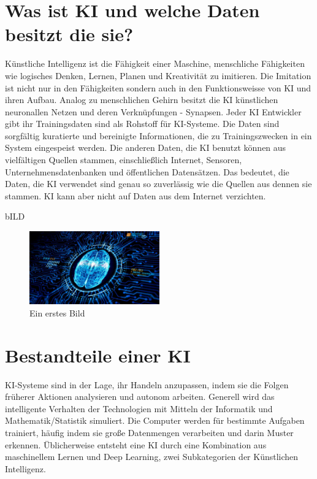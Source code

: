 \documentclass{report}
\begin{document}
\chapter{Was ist KI und welche Daten besitzt die sie?}

Künstliche Intelligenz ist die Fähigkeit einer Maschine, menschliche Fähigkeiten wie logisches Denken, 
Lernen, Planen und Kreativität zu imitieren. Die Imitation ist nicht nur in den Fähigkeiten sondern auch in den 
Funktionsweisse von KI und ihren Aufbau. Analog zu menschlichen Gehirn besitzt die KI künstlichen neuronallen Netzen und 
deren Verknüpfungen - Synapsen. Jeder KI Entwickler gibt ihr Trainingsdaten sind als Rohstoff für KI-Systeme. Die Daten sind sorgfältig 
kuratierte und bereinigte Informationen, die zu Trainingszwecken in ein System eingespeist werden.
Die anderen Daten, die KI benutzt können aus vielfältigen Quellen stammen, einschließlich Internet, Sensoren,
  Unternehmensdatenbanken und öffentlichen Datensätzen. Das bedeutet, die Daten, die KI verwendet sind genau so zuverlässig wie die Quellen aus dennen sie stammen.
KI kann aber nicht auf Daten aus dem Internet verzichten.  


bILD\begin{figure}[h]
  \centering 
  \includegraphics[width=0.5\textwidth]{ki-im-sensor.jpg} 
  \caption{Ein erstes Bild}
  \label{fig:meme}
  \end{figure}

   \chapter{Bestandteile einer KI}
 
KI-Systeme sind in der Lage, ihr Handeln anzupassen, indem sie die Folgen früherer Aktionen analysieren und autonom arbeiten.
 Generell wird das intelligente Verhalten der 
Technologien mit Mitteln der Informatik und Mathematik/Statistik simuliert.
 Die Computer werden für bestimmte Aufgaben trainiert, häufig indem sie große Datenmengen 
 verarbeiten und darin Muster erkennen. Üblicherweise entsteht eine KI durch eine Kombination aus maschinellem
  Lernen und Deep Learning, zwei Subkategorien der Künstlichen Intelligenz.
\end{document}
